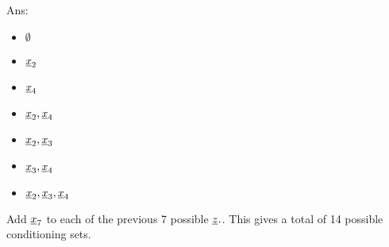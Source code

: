 \begin{enumerate}
Ans:
\begin{multicols}{4}
\begin{itemize}
\item $ \emptyset$
\item $\rvx_2$
\item $\rvx_4$
\item $\rvx_2, \rvx_4$
\item $\rvx_2,\rvx_3$
\item $\rvx_3, \rvx_4$
\item $\rvx_2, \rvx_3, \rvx_4$
\end{itemize}
\end{multicols}
Add $\rvx_7$
to each of the previous 7 possible
$\rvz.$. This gives
 a total of 14 possible
 conditioning sets. 


\end{enumerate}